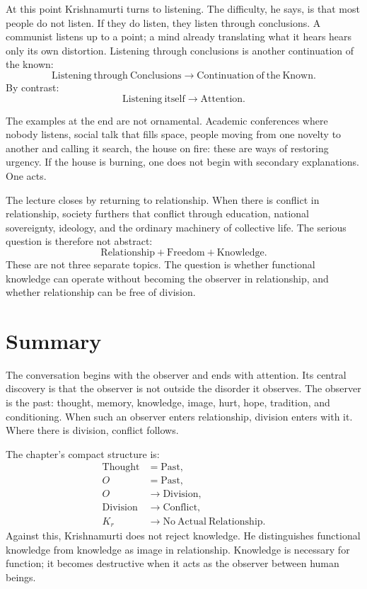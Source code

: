 At this point Krishnamurti turns to listening. The difficulty, he says, is that most people do not listen. If they do listen, they listen through conclusions. A communist listens up to a point; a mind already translating what it hears hears only its own distortion. Listening through conclusions is another continuation of the known:
\begin{equation}
\mathrm{Listening\ through\ Conclusions}
\longrightarrow
\mathrm{Continuation\ of\ the\ Known}.
\end{equation}
By contrast:
\begin{equation}
\mathrm{Listening\ itself}
\longrightarrow
\mathrm{Attention}.
\end{equation}

The examples at the end are not ornamental. Academic conferences where nobody listens, social talk that fills space, people moving from one novelty to another and calling it search, the house on fire: these are ways of restoring urgency. If the house is burning, one does not begin with secondary explanations. One acts.

The lecture closes by returning to relationship. When there is conflict in relationship, society furthers that conflict through education, national sovereignty, ideology, and the ordinary machinery of collective life. The serious question is therefore not abstract:
\begin{equation}
\mathrm{Relationship}
+
\mathrm{Freedom}
+
\mathrm{Knowledge}.
\end{equation}
These are not three separate topics. The question is whether functional knowledge can operate without becoming the observer in relationship, and whether relationship can be free of division.

\section{Summary}

The conversation begins with the observer and ends with attention. Its central discovery is that the observer is not outside the disorder it observes. The observer is the past: thought, memory, knowledge, image, hurt, hope, tradition, and conditioning. When such an observer enters relationship, division enters with it. Where there is division, conflict follows.

The chapter's compact structure is:
\begin{align}
\mathrm{Thought} &= \mathrm{Past},\\
O &= \mathrm{Past},\\
O &\longrightarrow \mathrm{Division},\\
\mathrm{Division} &\longrightarrow \mathrm{Conflict},\\
K_r &\longrightarrow \mathrm{No\ Actual\ Relationship}.
\end{align}
Against this, Krishnamurti does not reject knowledge. He distinguishes functional knowledge from knowledge as image in relationship. Knowledge is necessary for function; it becomes destructive when it acts as the observer between human beings.

